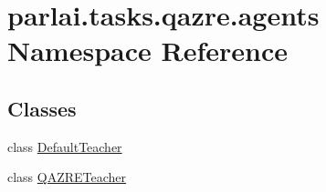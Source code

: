 \hypertarget{namespaceparlai_1_1tasks_1_1qazre_1_1agents}{}\section{parlai.\+tasks.\+qazre.\+agents Namespace Reference}
\label{namespaceparlai_1_1tasks_1_1qazre_1_1agents}
\subsection*{Classes}
\begin{DoxyCompactItemize}
\item 
class \hyperlink{classparlai_1_1tasks_1_1qazre_1_1agents_1_1DefaultTeacher}{Default\+Teacher}
\item 
class \hyperlink{classparlai_1_1tasks_1_1qazre_1_1agents_1_1QAZRETeacher}{Q\+A\+Z\+R\+E\+Teacher}
\end{DoxyCompactItemize}
